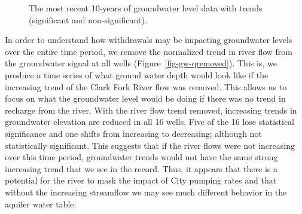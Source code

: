 \documentclass[
  letterpaper,
  DIV=11,
  numbers=noendperiod]{scrartcl}
\begin{document}
\begin{figure}


\caption{\label{fig-gw-recent}The most recent 10-years of groundwater
level data with trends (significant and non-significant).}

\end{figure}%

In order to understand how withdrawals may be impacting groundwater
levels over the entire time period, we remove the normalized trend in
river flow from the groundwater signal at all wells
(Figure~\ref{fig-gw-qremoved}). This is, we produce a time series of
what ground water depth would look like if the increasing trend of the
Clark Fork River flow was removed. This allows us to focus on what the
groundwater level would be doing if there was no trend in recharge from
the river. With the river flow trend removed, increasing trends in
groundwater elevation are reduced in all 16 wells. Five of the 16 lose
statistical significance and one shifts from increasing to decreasing;
although not statistically significant. This suggests that if the river
flows were not increasing over this time period, groundwater trends
would not have the same strong increasing trend that we see in the
record. Thus, it appears that there is a potential for the river to mask
the impact of City pumping rates and that without the increasing
streamflow we may see much different behavior in the aquifer water
table.
\end{document}

